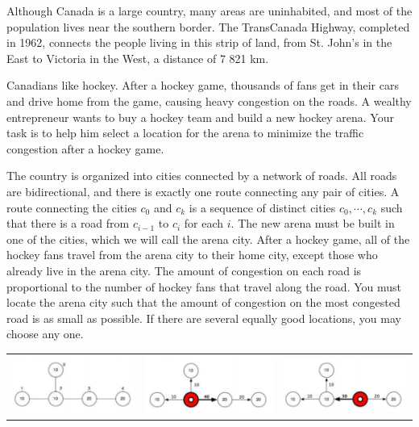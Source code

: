 Although Canada is a large country, many areas are uninhabited, and most of the population lives near the southern border. The TransCanada Highway, completed in 1962, connects the people living in this strip of land, from St. John's in the East to Victoria in the West, a distance of 7 821 km.

Canadians like hockey. After a hockey game, thousands of fans get in their cars and
drive home from the game, causing heavy congestion on the roads. A wealthy
entrepreneur wants to buy a hockey team and build a new hockey arena. Your task is
to help him select a location for the arena to minimize the traffic congestion after a
hockey game.

The country is organized into cities connected by a network of roads. All roads are bidirectional, and there is exactly one route connecting any pair of cities. A route connecting the cities $c_0$ and $c_k$ is a sequence of distinct cities $c_0, \cdots, c_k$ such that there is a road from $c_{i-1}$ to $c_i$ for each $i$. The new arena
must be built in one of the cities, which we will call the arena city. After a hockey game, all of the hockey fans travel from the arena city to their home city, except those who already live in the arena city. The amount of congestion on each road is proportional to the number of hockey fans that travel along the road. You must locate the arena city such that the amount of congestion on the most congested road is as small as possible. If there are several equally good locations, you may choose any one.

\begin{tabular}{ccc}
\includegraphics[scale=0.45]{traffic1.png} &
\includegraphics[scale=0.45]{traffic2.png} &
\includegraphics[scale=0.45]{traffic3.png}
\end{tabular}


